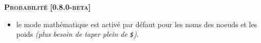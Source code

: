 \separation




\begin{center}
    \textbf{\textsc{Probabilité [0.8.0-beta]}}
\end{center}

\begin{itemize}[itemsep=.5em]
    \item {}
          le mode mathématique est activé par défaut pour les noms des noeuds et les poids \emph{(plus besoin de taper plein de \texttt{\$})}.
\end{itemize}


\separation

